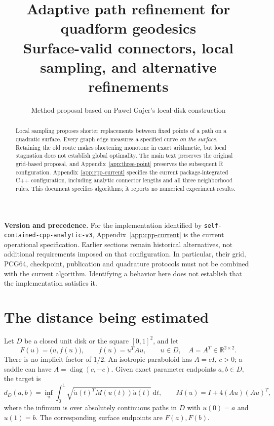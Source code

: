 \documentclass[11pt,letterpaper]{article}
\title{\color{ink}\textbf{Adaptive path refinement for quadform geodesics}\\[5pt]\large Surface-valid connectors, local sampling, and alternative refinements}
\author{Method proposal based on Pawel Gajer's local-disk construction}
\date{}
\newcommand{\R}{\mathbb{R}}
\newcommand{\dd}{\,\mathrm{d}}
\newcommand{\src}[1]{\nolinkurl{#1}}
\begin{document}
\maketitle
\thispagestyle{fancy}
\begin{abstract}
\noindent Local sampling proposes shorter replacements between fixed points of a path on a quadratic surface. Every graph edge measures a specified curve \emph{on the surface}. Retaining the old route makes shortening monotone in exact arithmetic, but local stagnation does not establish global optimality. The main text preserves the original grid-based proposal, and Appendix~\ref{app:three-point} preserves the subsequent R configuration. Appendix~\ref{app:cpp-current} specifies the current package-integrated C++ configuration, including analytic connector lengths and all three neighborhood rules. This document specifies algorithms; it reports no numerical experiment results.
\end{abstract}

\textbf{Version and precedence.} For the implementation identified by
\src{self-contained-cpp-analytic-v3}, Appendix~\ref{app:cpp-current} is the
current operational specification. Earlier sections remain historical
alternatives, not additional requirements imposed on that configuration.
In particular, their grid, PCG64, checkpoint, publication and quadrature
protocols must not be combined with the current algorithm. Identifying a
behavior here does not establish that the implementation satisfies it.

\section{The distance being estimated}
Let $D$ be a closed unit disk or the square $[0,1]^2$, and let
\begin{equation}\label{eq:surface}
 F(u)=\bigl(u,f(u)\bigr),\qquad f(u)=u^T A u,\qquad u\in D,\quad A=A^T\in\R^{2\times2}.
\end{equation}
There is no implicit factor of $1/2$. An isotropic paraboloid has $A=cI$, $c>0$; a saddle can have $A=\operatorname{diag}(c,-c)$. Given exact parameter endpoints $a,b\in D$, the target is
\begin{equation}\label{eq:distance}
 d_D(a,b)=\inf_{u}\int_0^1\sqrt{\dot u(t)^T M(u(t))\dot u(t)}\dd t,
 \qquad M(u)=I+4(Au)(Au)^T,
\end{equation}
where the infimum is over absolutely continuous paths in $D$ with $u(0)=a$ and $u(1)=b$. The corresponding surface endpoints are $F(a),F(b)$.
\end{document}
